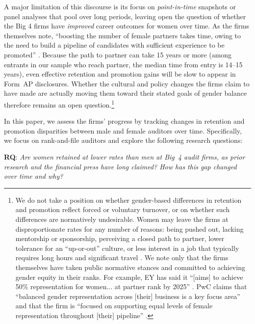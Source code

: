 \documentclass[11pt]{article}
\begin{document}
    A major limitation of this discourse is its focus on \textit{point-in-time} snapshots or panel analyses that pool over long periods, leaving open the question of whether the Big 4 firms have \textit{improved} career outcomes for women over time. As the firms themselves note, ``boosting the number of female partners takes time, owing to the need to build a pipeline of candidates with sufficient experience to be promoted'' \parencite{kissinBigFourAccounting2025}. Because the path to partner can take 15 years or more (among entrants in our sample who reach partner, the median time from entry is 14--15 years), even effective retention and promotion gains will be slow to appear in Form~AP disclosures. Whether the cultural and policy changes the firms claim to have made are actually moving them toward their stated goals of gender balance therefore remains an open question.\footnote{We do not take a position on whether gender-based differences in retention and promotion reflect forced or voluntary turnover, or on whether such differences are normatively undesirable. Women may leave the firms at disproportionate rates for any number of reasons: being pushed out, lacking mentorship or sponsorship, perceiving a closed path to partner, lower tolerance for an ``up-or-out'' culture, or less interest in a job that typically requires long hours and significant travel \parencite[see, e.g.,][for a structural model of accountants' career choices across sectors]{choiMarketAccountants2025}. We note only that the firms themselves have taken public normative stances and committed to achieving gender equity in their ranks. For example, EY has said it ``[aims] to achieve 50\% representation for women... at partner rank by 2025'' \parencite{eyEYUSDiversity2022, edgleyDiversityProfessionalismBig2016}. PwC claims that ``balanced gender representation across [their] business is a key focus area'' and that the firm is ``focused on supporting equal levels of female representation throughout [their] pipeline'' \parencite{pwcGenderEquity2023}.}
    
    In this paper, we assess the firms' progress by tracking changes in retention and promotion disparities between male and female auditors over time. Specifically, we focus on rank-and-file auditors and explore the following research questions: 

    \vspace{2mm}
    \noindent \textbf{RQ}: \textit{Are women retained at lower rates than men at Big~4 audit firms, as prior research and the financial press have long claimed? How has this gap changed over time and why?} 
    \vspace{2mm}
\end{document}
